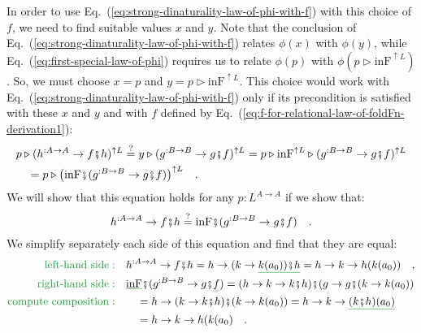 In order to use Eq.~(\ref{eq:strong-dinaturality-law-of-phi-with-f})
with this choice of $f$, we need to find suitable values $x$ and
$y$. Note that the conclusion of Eq.~(\ref{eq:strong-dinaturality-law-of-phi-with-f})
relates $\phi(x)$ with $\phi(y)$, while Eq.~(\ref{eq:first-special-law-of-phi})
requires us to relate $\phi(p)$ with $\phi(p\triangleright\text{inF}^{\uparrow L})$.
So, we must choose $x=p$ and $y=p\triangleright\text{inF}^{\uparrow L}$.
This choice would work with Eq.~(\ref{eq:strong-dinaturality-law-of-phi-with-f})
only if its precondition is satisfied with these $x$ and $y$ and
with $f$ defined by Eq.~(\ref{eq:f-for-relational-law-of-foldFn-derivation1}):
\begin{align*}
 & p\triangleright(h^{:A\rightarrow A}\rightarrow f\bef h)^{\uparrow L}\overset{?}{=}y\triangleright(g^{:B\rightarrow B}\rightarrow g\bef f)^{\uparrow L}=p\triangleright\text{inF}^{\uparrow L}\triangleright(g^{:B\rightarrow B}\rightarrow g\bef f)^{\uparrow L}\\
 & \quad=p\triangleright\big(\text{inF}\bef(g^{:B\rightarrow B}\rightarrow g\bef f)\big)^{\uparrow L}\quad.
\end{align*}
We will show that this equation holds for any $p:L^{A\rightarrow A}$
if we show that:
\[
h^{:A\rightarrow A}\rightarrow f\bef h\overset{?}{=}\text{inF}\bef(g^{:B\rightarrow B}\rightarrow g\bef f)\quad.
\]
We simplify separately each side of this equation and find that they
are equal:
\begin{align*}
{\color{greenunder}\text{left-hand side}:}\quad & h^{:A\rightarrow A}\rightarrow f\bef h=h\rightarrow(k\rightarrow\gunderline{k(a_{0}))\bef h}=h\rightarrow k\rightarrow h(k(a_{0}))\quad,\\
{\color{greenunder}\text{right-hand side}:}\quad & \gunderline{\text{inF}}\bef(g^{:B\rightarrow B}\rightarrow g\bef\gunderline f)=(h\rightarrow k\rightarrow k\bef h)\bef(g\rightarrow g\bef(k\rightarrow k(a_{0}))\\
{\color{greenunder}\text{compute composition}:}\quad & \quad=h\rightarrow(k\rightarrow k\bef h)\bef(k\rightarrow k(a_{0}))=h\rightarrow k\rightarrow\gunderline{(k\bef h)(a_{0})}\\
 & \quad=h\rightarrow k\rightarrow h(k(a_{0})\quad.
\end{align*}

